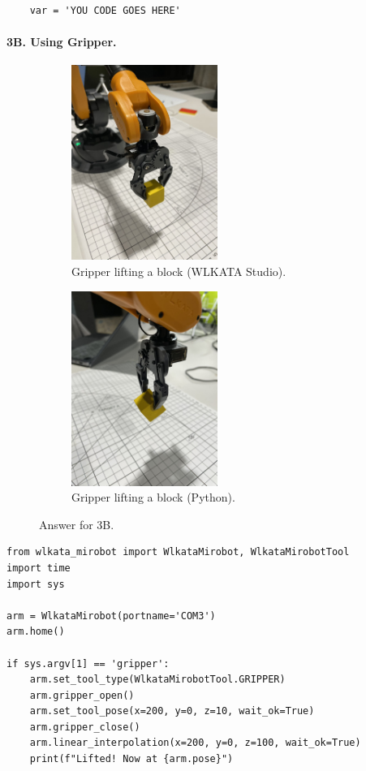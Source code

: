 %
\begin{verbatim}
    var = 'YOU CODE GOES HERE'
\end{verbatim}

\newpage
\paragraph{3B. Using Gripper.}
\begin{figure}
    \centering
    \begin{subfigure}[b]{0.3\textwidth}
        \includegraphics[height=2.5in]{image/3b.jpg}
         \caption*{Gripper lifting a block (WLKATA Studio).}
     \end{subfigure}
     \hfill
     \begin{subfigure}[b]{0.3\textwidth}
        \includegraphics[height=2.5in]{image/3b_python.jpg}
         \caption*{Gripper lifting a block (Python).}
     \end{subfigure}
    \caption*{Answer for 3B.}
\end{figure}
%
\begin{verbatim}
from wlkata_mirobot import WlkataMirobot, WlkataMirobotTool
import time
import sys

arm = WlkataMirobot(portname='COM3')
arm.home()

if sys.argv[1] == 'gripper':
    arm.set_tool_type(WlkataMirobotTool.GRIPPER)
    arm.gripper_open()
    arm.set_tool_pose(x=200, y=0, z=10, wait_ok=True)
    arm.gripper_close()
    arm.linear_interpolation(x=200, y=0, z=100, wait_ok=True)
    print(f"Lifted! Now at {arm.pose}")
\end{verbatim}


